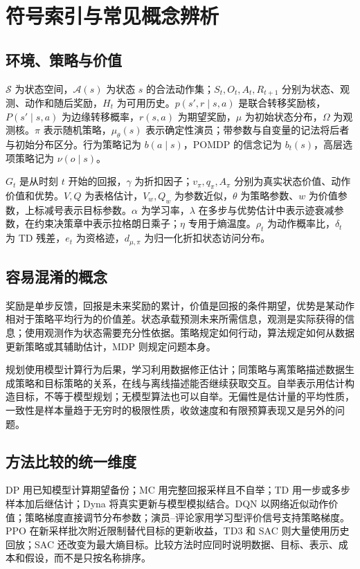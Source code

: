 \documentclass[UTF8,12pt,a4paper,fontset=fandol]{ctexbook}
\begin{document}
\appendix

\chapter{符号索引与常见概念辨析}
\label{app:rl-notation}

\section{环境、策略与价值}

$\mathcal S$ 为状态空间，$\mathcal A(s)$ 为状态 $s$ 的合法动作集；$S_t,O_t,A_t,R_{t+1}$ 分别为状态、观测、动作和随后奖励，$H_t$ 为可用历史。$p(s',r\mid s,a)$ 是联合转移奖励核，$P(s'\mid s,a)$ 为边缘转移概率，$r(s,a)$ 为期望奖励，$\mu$ 为初始状态分布，$\Omega$ 为观测核。$\pi$ 表示随机策略，$\mu_\theta(s)$ 表示确定性演员；带参数与自变量的记法将后者与初始分布区分。行为策略记为 $b(a\mid s)$，POMDP 的信念记为 $b_t(s)$，高层选项策略记为 $\nu(o\mid s)$。

$G_t$ 是从时刻 $t$ 开始的回报，$\gamma$ 为折扣因子；$v_\pi,q_\pi,A_\pi$ 分别为真实状态价值、动作价值和优势。$V,Q$ 为表格估计，$V_w,Q_w$ 为参数近似，$\theta$ 为策略参数、$w$ 为价值参数，上标减号表示目标参数。$\alpha$ 为学习率，$\lambda$ 在多步与优势估计中表示迹衰减参数，在约束决策章中表示拉格朗日乘子；$\eta$ 专用于熵温度。$\rho_t$ 为动作概率比，$\delta_t$ 为 TD 残差，$e_t$ 为资格迹，$d_{\mu,\pi}$ 为归一化折扣状态访问分布。

\section{容易混淆的概念}

奖励是单步反馈，回报是未来奖励的累计，价值是回报的条件期望，优势是某动作相对于策略平均行为的价值差。状态承载预测未来所需信息，观测是实际获得的信息；使用观测作为状态需要充分性依据。策略规定如何行动，算法规定如何从数据更新策略或其辅助估计，MDP 则规定问题本身。

规划使用模型计算行为后果，学习利用数据修正估计；同策略与离策略描述数据生成策略和目标策略的关系，在线与离线描述能否继续获取交互。自举表示用估计构造目标，不等于模型规划；无模型算法也可以自举。无偏性是估计量的平均性质，一致性是样本量趋于无穷时的极限性质，收敛速度和有限预算表现又是另外的问题。

\section{方法比较的统一维度}

DP 用已知模型计算期望备份；MC 用完整回报采样且不自举；TD 用一步或多步样本加后继估计；Dyna 将真实更新与模型模拟结合。DQN 以网络近似动作价值；策略梯度直接调节分布参数；演员--评论家用学习型评价信号支持策略梯度。PPO 在新采样批次附近限制替代目标的更新收益，TD3 和 SAC 则大量使用历史回放；SAC 还改变为最大熵目标。比较方法时应同时说明数据、目标、表示、成本和假设，而不是只按名称排序。
\end{document}
